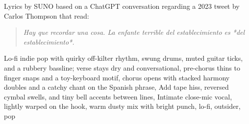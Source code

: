 
\begin{notes}
Lyrics by SUNO based on a ChatGPT conversation regarding a 2023 tweet by Carlos Thompson that read:
\begin{quote}\itshape%
Hay que recordar una cosa. La enfante terrible del establecimiento es *del establecimiento*.
\end{quote}
\end{notes}
\begin{style}
Lo-fi indie pop with quirky off-kilter rhythm, swung drums, muted guitar ticks, and a rubbery bassline; verse stays dry and conversational, pre-chorus thins to finger snaps and a toy-keyboard motif, chorus opens with stacked harmony doubles and a catchy chant on the Spanish phrase, Add tape hiss, reversed cymbal swells, and tiny bell accents between lines, Intimate close-mic vocal, lightly warped on the hook, warm dusty mix with bright punch, lo-fi, outsider, pop
\end{style}
